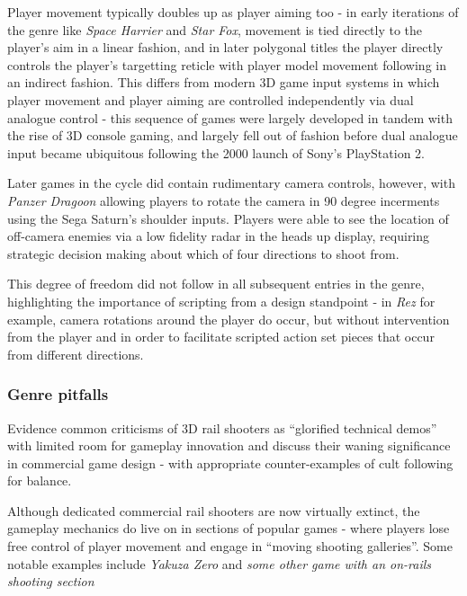 \documentclass[11pt]{article}
\begin{document}
Player movement typically doubles up as player aiming too - in early iterations of the genre like
\textit{Space Harrier} and \textit{Star Fox}, movement is tied directly to the player's aim in a
linear fashion, and in later polygonal titles the player directly controls the player's targetting
reticle with player model movement following in an indirect fashion. This differs from modern 3D
game input systems in which player movement and player aiming are controlled independently via dual 
analogue control - this sequence of games were largely developed in tandem with the rise of 3D console
gaming, and largely fell out of fashion before dual analogue input became ubiquitous following the
2000 launch of Sony's PlayStation 2.


Later games in the cycle did contain rudimentary camera controls, however, with \textit{Panzer Dragoon}
allowing players to rotate the camera in 90 degree incerments using the Sega Saturn's shoulder inputs.
Players were able to see the location of off-camera enemies via a low fidelity radar in the heads up
display, requiring strategic decision making about which of four directions to shoot from.

This degree of freedom did not follow in all subsequent entries in the genre, highlighting the importance
of scripting from a design standpoint - in \textit{Rez} for example, camera rotations around the player
do occur, but without intervention from the player and in order to facilitate scripted action
set pieces that occur from different directions.

\subsubsection*{Genre pitfalls}
Evidence common criticisms of 3D rail shooters as ``glorified technical demos'' with
limited room for gameplay innovation and discuss their waning significance in
commercial game design - with appropriate counter-examples of cult following for
balance.

Although dedicated commercial rail shooters are now virtually extinct, the gameplay mechanics
do live on in sections of popular games - where players lose free control of player movement
and engage in ``moving shooting galleries''. Some notable examples include \textit{Yakuza Zero}
and \textit{some other game with an on-rails shooting section}
\end{document}
